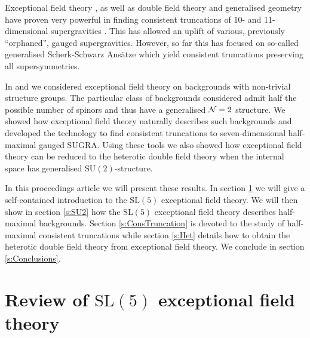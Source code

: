 \documentclass{PoS}
\newcommand{\SU}[1]{\mathrm{SU}( #1 )}
\newcommand{\SL}[1]{\mathrm{SL}( #1 )}
\begin{document}
Exceptional field theory \cite{Berman:2010is,Hohm:2013vpa}, as well as double field theory \cite{Hull:2009mi} and generalised geometry \cite{Gualtieri:2003dx,Coimbra:2011ky,Coimbra:2011nw} have proven very powerful in finding consistent truncations of 10- and 11-dimensional supergravities \cite{Aldazabal:2011nj,Geissbuhler:2011mx,Grana:2012rr,Dibitetto:2012rk,Berman:2012uy,Hohm:2014qga,Lee:2014mla,Lee:2015xga,Baguet:2015sma,Malek:2015hma,Baguet:2015iou}. This has allowed an uplift of various, previously ``orphaned'', gauged supergravities. However, so far this has focused on so-called generalised Scherk-Schwarz Ans\"atze which yield consistent truncations preserving all supersymmetries.

In \cite{Malek:2016bpu} and \cite{Malek:2016vsh} we considered exceptional field theory on backgrounds with non-trivial structure groups. The particular class of backgrounds considered admit half the possible number of spinors and thus have a generalised ${\cal N}=2$ structure. We showed how exceptional field theory naturally describes such backgrounds and developed the technology to find consistent truncations to seven-dimensional half-maximal gauged SUGRA. Using these tools we also showed how exceptional field theory can be reduced to the heterotic double field theory when the internal space has generalised $\SU{2}$-structure.

In this proceedings article we will present these results. In section \ref{s:Review} we will give a self-contained introduction to the $\SL{5}$ exceptional field theory. We will then show in section \ref{s:SU2} how the $\SL{5}$ exceptional field theory describes half-maximal backgrounds. Section \ref{s:ConsTruncation} is devoted to the study of half-maximal consistent truncations while section \ref{s:Het} details how to obtain the heterotic double field theory from exceptional field theory. We conclude in section \ref{s:Conclusions}.

\section{Review of $\SL{5}$ exceptional field theory}\label{s:Review}
\end{document}
